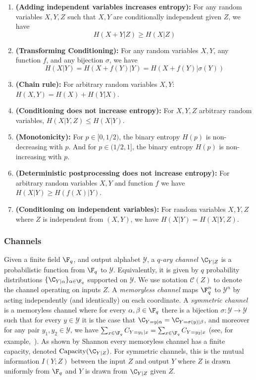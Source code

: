 \documentclass[11pt]{article}
\begin{document}
\begin{enumerate}
	\item {\bf (Adding independent variables increases entropy):}
	For any random variables $X, Y, Z$ such that $X, Y$ are conditionally independent given $Z$, we have
	\begin{equation}
		\label{eqn:adding-indep}
		H(X + Y | Z) \geq H(X | Z)
	\end{equation}
	
	\item {\bf (Transforming Conditioning):}
	For any random variables $X, Y$, any function $f$, and any bijection $\sigma$,
	we have
	\begin{equation}
		\label{eqn:transform-conditioning}
		H(X | Y) = H(X + f(Y) | Y) = H(X + f(Y) | \sigma(Y))
	\end{equation}
	
	\item {\bf (Chain rule):}
	For arbitrary random variables $X, Y$:
	$H(X, Y) = H(X) + H(Y | X)$.
	\item {\bf (Conditioning does not increase entropy):}
	For $X, Y, Z$ arbitrary random variables, $H(X | Y, Z) \leq H(X | Y)$.
	\item {\bf (Monotonicity):} For $p \in [0, 1/2)$, the binary entropy $H(p)$ is non-decreasing with $p$. And for $p \in (1/2, 1]$, the binary entropy $H(p)$
	is non-increasing with $p$.
	\item {\bf (Deterministic postprocessing does not increase entropy):} For arbitrary random variables $X, Y$ and function $f$ we have $H(X | Y) \geq H(f(X) |Y )$.
	\item {\bf (Conditioning on independent variables):}
	For random variables $X, Y, Z$ where $Z$ is independent from $(X, Y)$, we
	have $H(X | Y) = H(X | Y, Z)$.
\end{enumerate}


\subsubsection{Channels}
\label{sec:channel}
Given a finite field $\F_q$, and output alphabet $\mathcal{Y}$, a \emph{$q$-ary channel} $\C_{Y|Z}$
is a probabilistic function from $\F_q$ to $\mathcal{Y}$.
Equivalently, it is given by $q$ probability distributions $\{\C_{Y|\alpha}\}_{\alpha \in \F_q}$ supported on $\mathcal{Y}$.
We use notation $\mathcal{C}(Z)$ to denote the channel operating on inputs
$Z$.
A \emph{memoryless channel} maps $\F_q^n$ to $\mathcal{Y}^n$ by acting independently (and identically) on each coordinate.
A \emph{symmetric channel} is a memoryless channel where for every $\alpha,\beta \in \F_q$ there is a bijection $\sigma:\mathcal{Y}\to \mathcal{Y}$ such that for every $y \in \mathcal{Y}$ it is the case that $\C_{Y=y|\alpha} = \C_{Y = \sigma(y)|\beta}$, and moreover for any pair $y_1, y_2 \in \mathcal{Y}$, we have $\sum_{x \in \F_q} C_{Y=y_1 | x} = \sum_{x \in \F_q} C_{Y=y_2 | x}$ (see, for example,~\cite[Section 7.2]{CoverThomas}).
As shown by Shannon every memoryless channel has a finite capacity, denoted
$\mathrm{Capacity}(\C_{Y|Z})$.
For symmetric channels, this is the mutual
information $I(Y; Z)$ between the input $Z$ and output $Y$ where $Z$ is drawn uniformly from $\F_q$ and $Y$ is drawn from $\C_{Y|Z}$ given $Z$.
\end{document}
